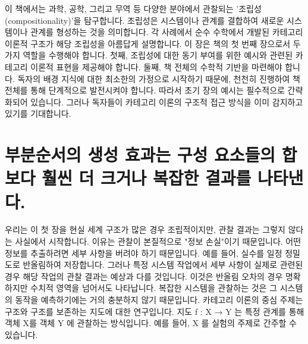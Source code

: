 \documentclass[11pt, a4paper, twoside, openany]{book}
\begin{document}
\tableofcontents
\clearpage


이 책에서는 과학, 공학, 그리고 무역 등 다양한 분야에서 관찰되는 '조립성(compositionality)'을 탐구합니다. 조립성은 시스템이나 관계를 결합하여 새로운 시스템이나 관계를 형성하는 것을 의미합니다. 각 사례에서 순수 수학에서 개발된 카테고리 이론적 구조가 해당 조립성을 아름답게 설명합니다. 이 장은 책의 첫 번째 장으로서 두 가지 역할을 수행해야 합니다. 첫째, 조립성에 대한 동기 부여를 위한 예시와 관련된 카테고리 이론적 표현을 제공해야 합니다. 둘째, 책 전체의 수학적 기반을 마련해야 합니다. 독자의 배경 지식에 대한 최소한의 가정으로 시작하기 때문에, 천천히 진행하여 책 전체를 통해 단계적으로 발전시켜야 합니다. 따라서 초기 장의 예시는 필수적으로 간략화되어 있습니다. 그러나 독자들이 카테고리 이론의 구조적 접근 방식을 이미 감지하고 있기를 기대합니다.


\section{부분순서의 생성 효과는 구성 요소들의 합보다 훨씬 더 크거나 복잡한 결과를 나타낸다.}
\par\medskip


우리는 이 첫 장을 현실 세계 구조가 많은 경우 조립적이지만, 관찰 결과는 그렇지 않다는 사실에서 시작합니다. 이유는 관찰이 본질적으로 "정보 손실"이기 때문입니다. 어떤 정보를 추출하려면 세부 사항을 버려야 하기 때문입니다. 예를 들어, 실수를 일정 정밀도로 반올림하여 저장합니다. 그러나 특정 시스템 작업에서 세부 사항이 실제로 관련된 경우 해당 작업의 관찰 결과는 예상과 다를 것입니다. 이것은 반올림 오차의 경우 명확하지만 수치적 영역을 넘어서도 나타납니다. 복잡한 시스템을 관찰하는 것은 그 시스템의 동작을 예측하기에는 거의 충분하지 않기 때문입니다. 카테고리 이론의 중심 주제는 구조와 구조를 보존하는 지도에 대한 연구입니다. 지도 f : X → Y 는 특정 관계를 통해 객체 X를 객체 Y 에 관찰하는 방식입니다. 예를 들어, X 를 실험의 주제로 간주할 수 있습니다.
\end{document}
